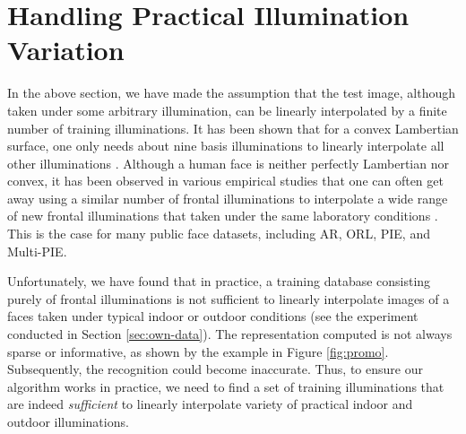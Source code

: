 \documentclass[10pt,twocolumn,letterpaper]{article}
\begin{document}
\section{Handling Practical Illumination Variation}\label{sec:illumination}\vspace{-2mm}
In the above section, we have made the assumption that the test image, although taken under some arbitrary illumination, can be linearly interpolated by a finite number of training illuminations. It has been shown that for a convex Lambertian surface, one only needs about nine basis illuminations to linearly interpolate all other illuminations \cite{Basri2003-PAMI}. Although a human face is neither perfectly Lambertian nor convex, it has been observed in various empirical studies that one can often get away using a similar number of frontal illuminations to interpolate a wide range of new frontal illuminations that taken under the same laboratory conditions \cite{Georghiades2001-PAMI}. This is the case for many public face datasets, including AR, ORL, PIE, and Multi-PIE. 

Unfortunately, we have found that in practice, a training database consisting purely of frontal illuminations is not sufficient to linearly interpolate images of a faces taken under typical indoor or outdoor conditions (see the experiment conducted in Section \ref{sec:own-data}). The representation computed is not always sparse or informative, as shown by the example in Figure \ref{fig:promo}. Subsequently, the recognition could become inaccurate. 
Thus, to ensure our algorithm works in practice, we need to find a set of training illuminations that are indeed {\em sufficient} to linearly interpolate variety of practical indoor and outdoor illuminations.\vspace{-3mm}
\end{document}
